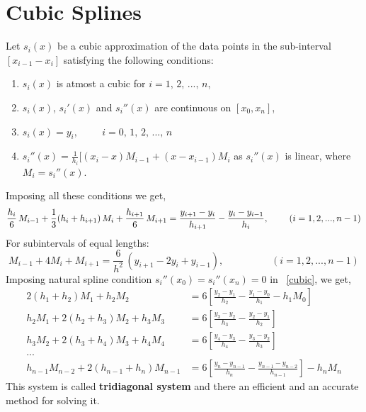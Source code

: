 \documentclass[aima203_lecturenotes_ku.tex]{subfiles}
\begin{document}
\section{Cubic Splines}
Let $s_i(x)$ be a cubic approximation of the data points in the sub-interval $[x_{i-1} -x_i]$ satisfying the following conditions:
\begin{enumerate}
\item $s_i(x)$ is atmost a cubic for $i = 1, \, 2, \, ..., \, n$,
\item $s_i(x)$, $s_i'(x)$ and $s_i''(x)$ are continuous on $[x_0,x_n]$,
\item $s_i(x)=y_i, \hspace{1cm} i=0,\, 1,\, 2, \, ..., \, n$
\item $s_i''(x) = \frac{1}{h_i} [ (x_i -x)M_{i-1} + (x-x_{i-1})M_i$ as $s_i''(x)$ is linear, where $M_i = s_i''(x)$.
\end{enumerate}
Imposing all these conditions we get,
\begin{equation}
  \label{cubic}
  \frac{h_i}{6}\, M_{i-1} + \frac{1}{3}(h_i + h_{i+1})\, M_{i} + \frac{h_{i+1}}{6}\, M_{i+1} = \frac{y_{i+1} - y_i}{h_{i+1}} - \frac{y_i - y_{i-1}}{h_i}, \hspace{8mm} (i=1,2,...,n-1)
\end{equation}
For subintervals of equal lengths:
\begin{equation}
  M_{i-1} + 4 M_i + M_{i+1} = \frac{6}{h^2}\, (y_{i+1} -2y_i + y_{i-1}), \hspace{2cm} (i=1,2,...,n-1)
\end{equation}
Imposing natural spline condition $s_i''(x_0) = s_i''(x_n) = 0$ in ~\ref{cubic}, we get,
\begin{align*}
  2(h_1+h_2)M_1 + h_2M_2 &= 6 \left[ \frac{y_2 - y_1}{h_2} - \frac{y_1 -y_0}{h_1} - h_1 M_0 \right ]\\[1mm]
  h_2M_1 + 2(h_2 + h_3)M_2 + h_3M_3 &= 6 \left[ \frac{y_3 - y_2}{h_3} - \frac{y_2 -y_1}{h_2}\right ] \\[1mm]
  h_3M_2 + 2(h_3 + h_4)M_3 + h_4M_4 &= 6 \left[ \frac{y_4 - y_3}{h_4} - \frac{y_3 -y_2}{h_3}\right ] \\[1mm]
  ... \\[1mm]
  h_{n-1}M_{n-2} + 2(h_{n-1} + h_n)M_{n-1} &= 6 \left[ \frac{y_n - y_{n-1}}{h_n} - \frac{y_{n-1} -y_{n-2}}{h_{n-1}}\right ] - h_n M_n
\end{align*}
This system is called \textbf{tridiagonal system} and there an efficient and an accurate method for solving it.
\end{document}
